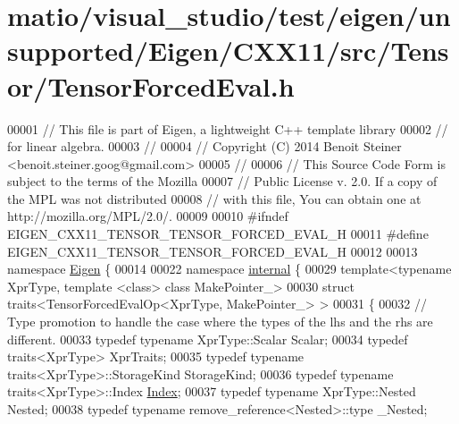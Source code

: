 \hypertarget{matio_2visual__studio_2test_2eigen_2unsupported_2_eigen_2_c_x_x11_2src_2_tensor_2_tensor_forced_eval_8h_source}{}\section{matio/visual\+\_\+studio/test/eigen/unsupported/\+Eigen/\+C\+X\+X11/src/\+Tensor/\+Tensor\+Forced\+Eval.h}
\label{matio_2visual__studio_2test_2eigen_2unsupported_2_eigen_2_c_x_x11_2src_2_tensor_2_tensor_forced_eval_8h_source}

\begin{DoxyCode}
00001 \textcolor{comment}{// This file is part of Eigen, a lightweight C++ template library}
00002 \textcolor{comment}{// for linear algebra.}
00003 \textcolor{comment}{//}
00004 \textcolor{comment}{// Copyright (C) 2014 Benoit Steiner <benoit.steiner.goog@gmail.com>}
00005 \textcolor{comment}{//}
00006 \textcolor{comment}{// This Source Code Form is subject to the terms of the Mozilla}
00007 \textcolor{comment}{// Public License v. 2.0. If a copy of the MPL was not distributed}
00008 \textcolor{comment}{// with this file, You can obtain one at http://mozilla.org/MPL/2.0/.}
00009 
00010 \textcolor{preprocessor}{#ifndef EIGEN\_CXX11\_TENSOR\_TENSOR\_FORCED\_EVAL\_H}
00011 \textcolor{preprocessor}{#define EIGEN\_CXX11\_TENSOR\_TENSOR\_FORCED\_EVAL\_H}
00012 
00013 \textcolor{keyword}{namespace }\hyperlink{namespace_eigen}{Eigen} \{
00014 
00022 \textcolor{keyword}{namespace }\hyperlink{namespaceinternal}{internal} \{
00029 \textcolor{keyword}{template}<\textcolor{keyword}{typename} XprType, \textcolor{keyword}{template} <\textcolor{keyword}{class}> \textcolor{keyword}{class }MakePointer\_>
00030 \textcolor{keyword}{struct }traits<TensorForcedEvalOp<XprType, MakePointer\_> >
00031 \{
00032   \textcolor{comment}{// Type promotion to handle the case where the types of the lhs and the rhs are different.}
00033   \textcolor{keyword}{typedef} \textcolor{keyword}{typename} XprType::Scalar Scalar;
00034   \textcolor{keyword}{typedef} traits<XprType> XprTraits;
00035   \textcolor{keyword}{typedef} \textcolor{keyword}{typename} traits<XprType>::StorageKind StorageKind;
00036   \textcolor{keyword}{typedef} \textcolor{keyword}{typename} traits<XprType>::Index \hyperlink{namespace_eigen_a62e77e0933482dafde8fe197d9a2cfde}{Index};
00037   \textcolor{keyword}{typedef} \textcolor{keyword}{typename} XprType::Nested Nested;
00038   \textcolor{keyword}{typedef} \textcolor{keyword}{typename} remove\_reference<Nested>::type \_Nested;

\end{DoxyCode}
